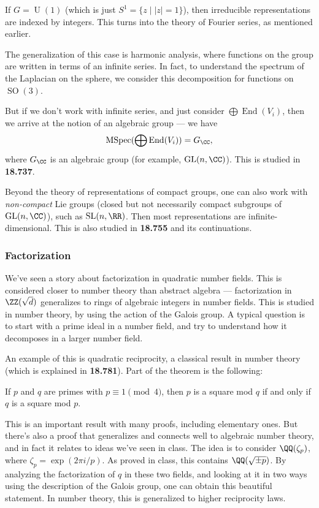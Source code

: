 \begin{example}
If $G = \operatorname{U}(1)$ (which is just $S^1 = \{z \mid \lvert z \rvert = 1\}$), then irreducible representations are indexed by integers. This turns into the theory of Fourier series, as mentioned earlier.
\end{example}

The generalization of this case is harmonic analysis, where functions on the group are written in terms of an infinite series. In fact, to understand the spectrum of the Laplacian on the sphere, we consider this decomposition for functions on $\operatorname{SO}(3)$. 

But if we don't work with infinite series, and just consider $\bigoplus \operatorname{End}(V_i)$, then we arrive at the notion of an algebraic group --- we have \[\operatorname{MSpec}(\bigoplus \operatorname{End}(V_i)) = G_{\CC},\] where $G_{\CC}$ is an algebraic group (for example, $\operatorname{GL}(n, \CC)$). This is studied in \textbf{18.737}. 

Beyond the theory of representations of compact groups, one can also work with \emph{non-compact} Lie groups (closed but not necessarily compact subgroups of $\operatorname{GL}(n, \CC)$), such as $\operatorname{SL}(n, \RR)$. Then most representations are infinite-dimensional. This is also studied in \textbf{18.755} and its continuations. 

\subsubsection{Factorization} 

We've seen a story about factorization in quadratic number fields. This is considered closer to number theory than abstract algebra --- factorization in $\ZZ(\sqrt{d})$ generalizes to rings of algebraic integers in number fields. This is studied in number theory, by using the action of the Galois group. A typical question is to start with a prime ideal in a number field, and try to understand how it decomposes in a larger number field. 

An example of this is quadratic reciprocity, a classical result in number theory (which is explained in \textbf{18.781}). Part of the theorem is the following:
\begin{example}
If $p$ and $q$ are primes with $p \equiv 1 \pmod{4}$, then $p$ is a square mod $q$ if and only if $q$ is a square mod $p$.
\end{example}

This is an important result with many proofs, including elementary ones. But there's also a proof that generalizes and connects well to algebraic number theory, and in fact it relates to ideas we've seen in class. The idea is to consider $\QQ(\zeta_p)$, where $\zeta_p = \exp(2\pi i/p)$. As proved in class, this contains $\QQ(\sqrt{\pm p})$. By analyzing the factorization of $q$ in these two fields, and looking at it in two ways using the description of the Galois group, one can obtain this beautiful statement. In number theory, this is generalized to higher reciprocity laws. 

